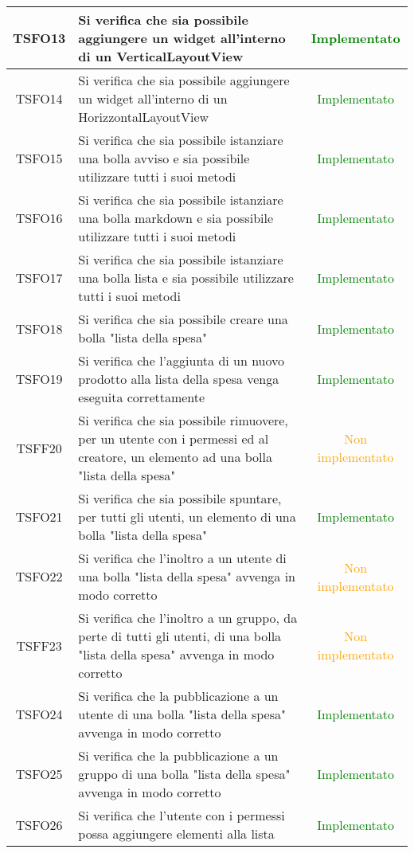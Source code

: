 \begin{center}
\begin{longtable}{|c|>{\centering}m{10cm}|c|}
		TSFO13 & Si verifica che sia possibile aggiungere un widget all'interno di un VerticalLayoutView & \textcolor{Green}{Implementato}\\ \hline
		TSFO14 & Si verifica che sia possibile aggiungere un widget all'interno di un HorizzontalLayoutView & \textcolor{Green}{Implementato}\\ \hline
		TSFO15 & Si verifica che sia possibile istanziare una bolla avviso e sia possibile utilizzare tutti i suoi metodi & \textcolor{Green}{Implementato}\\ \hline
		TSFO16 & Si verifica che sia possibile istanziare una bolla markdown e sia possibile utilizzare tutti i suoi metodi & \textcolor{Green}{Implementato}\\ \hline
		TSFO17 & Si verifica che sia possibile istanziare una bolla lista e sia possibile utilizzare tutti i suoi metodi & \textcolor{Green}{Implementato}\\ \hline
		TSFO18 & Si verifica che sia possibile creare una bolla "lista della spesa" & \textcolor{Green}{Implementato}\\ \hline
		TSFO19 & Si verifica che l'aggiunta di un nuovo prodotto alla lista della spesa venga eseguita correttamente & \textcolor{Green}{Implementato}\\ \hline
		TSFF20 & Si verifica che sia possibile rimuovere, per un utente con i permessi ed al creatore, un elemento ad una bolla "lista della spesa" & \textcolor{Orange}{Non implementato}\\ \hline
		TSFO21 & Si verifica che sia possibile spuntare, per tutti gli utenti, un elemento di una bolla "lista della spesa" & \textcolor{Green}{Implementato}\\ \hline
		TSFO22 & Si verifica che l'inoltro a un utente di una bolla "lista della spesa" avvenga in modo corretto & \textcolor{Orange}{Non implementato}\\ \hline
		TSFF23 & Si verifica che l'inoltro a un gruppo, da perte di tutti gli utenti, di una bolla "lista della spesa" avvenga in modo corretto & \textcolor{Orange}{Non implementato}\\ \hline
		TSFO24 & Si verifica che la pubblicazione a un utente di una bolla "lista della spesa" avvenga in modo corretto & \textcolor{Green}{Implementato}\\ \hline
		TSFO25 & Si verifica che la pubblicazione a un gruppo di una bolla "lista della spesa" avvenga in modo corretto & \textcolor{Green}{Implementato}\\ \hline
		TSFO26 & Si verifica che l'utente con i permessi possa aggiungere elementi alla lista & \textcolor{Green}{Implementato}\\ \hline

\end{longtable}
\end{center}
